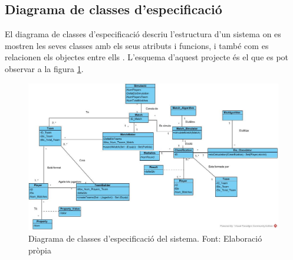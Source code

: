 \documentclass[a4paper]{article}
\begin{document}
\subsection{Diagrama de classes d'especificació}
El diagrama de classes d'especificació descriu l'estructura d'un sistema on es mostren les seves classes amb els seus atributs i funcions, i també com es relacionen els objectes entre ells \cite{wikipediaClassDiagram}. L'esquema d'aquest projecte és el que es pot observar a la figura \ref{fig:ClassDiagram}.
\begin{landscape}

\newpage
\thispagestyle{lndscape}
    \begin{center}
        \begin{figure}[h!]
            \includegraphics[width=1.5 \textwidth]{images/Diagrama_Classes2.jpg}%
            \caption{Diagrama de classes d'especificació del sistema. Font: Elaboració pròpia}
            \label{fig:ClassDiagram}
        \end{figure}
    \end{center}
\end{landscape}

\newpage
\end{document}
